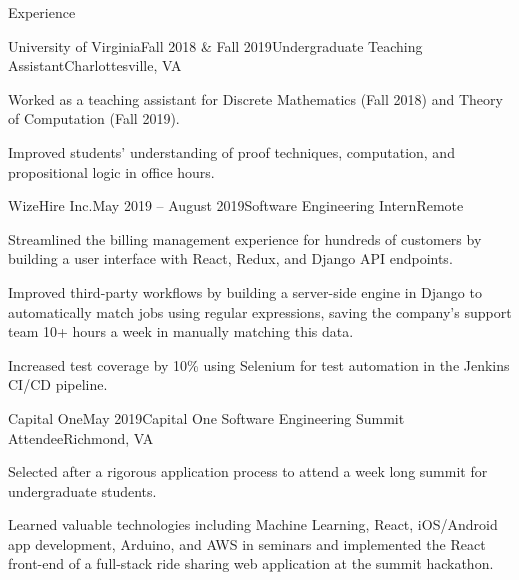\documentclass{resume}
\begin{document}
\begin{rSection}{Experience}

  \begin{rSubsection}{University of Virginia}{Fall 2018 \& Fall 2019}{Undergraduate Teaching Assistant}{Charlottesville, VA}
    \item Worked as a teaching assistant for Discrete Mathematics (Fall 2018) and Theory of Computation (Fall 2019).
    \item Improved students' understanding of proof techniques, computation, and propositional logic in office hours.
  \end{rSubsection}

  \begin{rSubsection}{WizeHire Inc.}{May 2019 -- August 2019}{Software Engineering Intern}{Remote}
    \item Streamlined the billing management experience for hundreds of customers by building a user interface with React, Redux, and Django API endpoints.
    \item Improved third-party workflows by building a server-side engine in Django to automatically match jobs using regular expressions, saving the company's support team 10+ hours a week in manually matching this data.
    \item Increased test coverage by 10\% using Selenium for test automation in the Jenkins CI/CD pipeline.
  \end{rSubsection}

  \begin{rSubsection}{Capital One}{May 2019}{Capital One Software Engineering Summit Attendee}{Richmond, VA}
    \item Selected after a rigorous application process to attend a week long summit for undergraduate students.
    \item Learned valuable technologies including Machine Learning, React, iOS/Android app development, Arduino, and AWS in seminars and implemented the React front-end of a full-stack ride sharing web application at the summit hackathon.
  \end{rSubsection}


\end{rSection}
\end{document}
